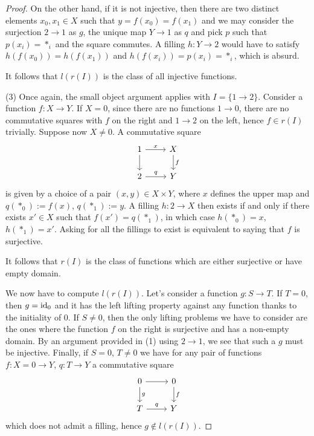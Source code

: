 \documentclass[a4paper,11pt,openany]{scrartcl}
\begin{document}
\begin{proof}
    \noindent On the other hand, if it is not
    injective, then there are two distinct elements $x_0,x_1\in X$ such that
    $y=f(x_0)=f(x_1)$ and we may consider the surjection $2\rightarrow 1$ as
    $g$, the unique map $Y\rightarrow 1$ as $q$ and pick $p$ such that
    $p(x_i)=*_i$ and the square commutes. A filling $h\colon Y\rightarrow 2$
    would have to satisfy $h(f(x_0))=h(f(x_1))$ and $h(f(x_i))=p(x_i)=*_i$,
    which is absurd.

    \noindent It follows that $l(r(I))$ is the class of all injective functions.

    (3) Once again, the small object argument applies with $I=\{1\rightarrow
    2\}$. Consider a function $f\colon X\rightarrow Y$. If $X=0$, since there
    are no functions $1\rightarrow 0$, there are no commutative squares with $f$
    on the right and $1\rightarrow 2$ on the left, hence $f\in r(I)$ trivially.
    Suppose now $X\neq 0$. A commutative square
    \[\begin{tikzcd}
	{1} & {X} \\
	{2} & {Y}
	\arrow["{x}", from=1-1, to=1-2]
	\arrow["{q}", from=2-1, to=2-2]
	\arrow[from=1-1, to=2-1]
	\arrow["{f}", from=1-2, to=2-2]
    \end{tikzcd}\]
    is given by a choice of a pair $(x,y)\in X\times Y$, where $x$ defines the
    upper map and $q(*_0):=f(x)$, $q(*_1):=y$. A filling $h\colon 2\rightarrow
    X$ then exists if and only if there exists $x'\in X$ such that
    $f(x')=q(*_1)$, in which case $h(*_0)=x$, $h(*_1)=x'$. Asking for all the
    fillings to exist is equivalent to saying that $f$ is surjective.

    It follows that $r(I)$ is the class of functions which are either surjective
    or have empty domain.

    We now have to compute $l(r(I))$. Let's consider a function $g\colon
    S\rightarrow T$. If $T=0$, then $g=\operatorname{id}_0$ and it has the left lifting
    property against any function thanks to the initiality of 0. If $S\neq 0$,
    then the only lifting problems we have to consider are the ones where the
    function $f$ on the right is surjective and has a non-empty domain. By an
    argument provided in (1) using $2\rightarrow 1$, we see that such a $g$ must
    be injective. Finally,
    if $S=0$, $T\neq 0$ we have for any pair of functions $f\colon
    X=0\rightarrow Y$, $q\colon T\rightarrow Y$ a commutative square
    \[\begin{tikzcd}
	{0} & {0} \\
	{T} & {Y}
	\arrow[from=1-1, to=1-2]
	\arrow["{q}", from=2-1, to=2-2]
    \arrow["{g}", from=1-1, to=2-1]
	\arrow["{f}", from=1-2, to=2-2]
    \end{tikzcd}\]
    which does not admit a filling, hence $g\not\in l(r(I))$.


\end{proof}
\end{document}
